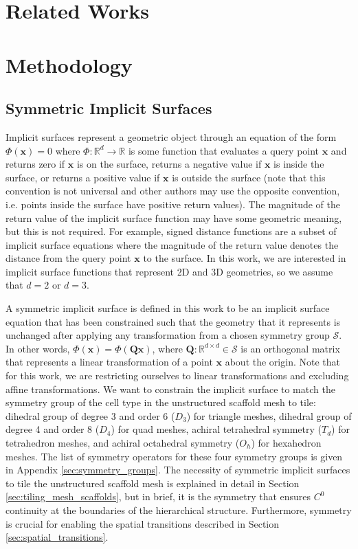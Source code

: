 \documentclass[acmtog]{acmart}
\begin{document}
\section{Related Works}

\section{Methodology}

\subsection{Symmetric Implicit Surfaces}
\label{sec:symmetric_implicit_surfaces}

Implicit surfaces represent a geometric object through an equation of the form $\Phi(\mathbf{x}) = 0$ where $\Phi: \mathbb{R}^d \rightarrow \mathbb{R}$ is some function that evaluates a query point $\mathbf{x}$ and returns zero if $\mathbf{x}$ is on the surface, returns a negative value if $\mathbf{x}$ is inside the surface, or returns a positive value if $\mathbf{x}$ is outside the surface (note that this convention is not universal and other authors may use the opposite convention, i.e. points inside the surface have positive return values). The magnitude of the return value of the implicit surface function may have some geometric meaning, but this is not required. For example, signed distance functions are a subset of implicit surface equations where the magnitude of the return value denotes the distance from the query point $\mathbf{x}$ to the surface. In this work, we are interested in implicit surface functions that represent 2D and 3D geometries, so we assume that $d = 2$ or $d = 3$.

A symmetric implicit surface is defined in this work to be an implicit surface equation that has been constrained such that the geometry that it represents is unchanged after applying any transformation from a chosen symmetry group $\mathcal{S}$. In other words, $\Phi(\mathbf{x}) = \Phi(\mathbf{Q} \mathbf{x})$, where $\mathbf{Q}: \mathbb{R}^{d \times d} \in \mathcal{S}$ is an orthogonal matrix that represents a linear transformation of a point $\mathbf{x}$ about the origin. Note that for this work, we are restricting ourselves to linear transformations and excluding affine transformations. We want to constrain the implicit surface to match the symmetry group of the cell type in the unstructured scaffold mesh to tile: dihedral group of degree 3 and order 6 ($D_3$) for triangle meshes, dihedral group of degree 4 and order 8 ($D_4$) for quad meshes, achiral tetrahedral symmetry ($T_d$) for tetrahedron meshes, and achiral octahedral symmetry ($O_h$) for hexahedron meshes. The list of symmetry operators for these four symmetry groups is given in Appendix \ref{sec:symmetry_groups}. The necessity of symmetric implicit surfaces to tile the unstructured scaffold mesh is explained in detail in Section \ref{sec:tiling_mesh_scaffolds}, but in brief, it is the symmetry that ensures $C^0$ continuity at the boundaries of the hierarchical structure. Furthermore, symmetry is crucial for enabling the spatial transitions described in Section \ref{sec:spatial_transitions}.
\end{document}

